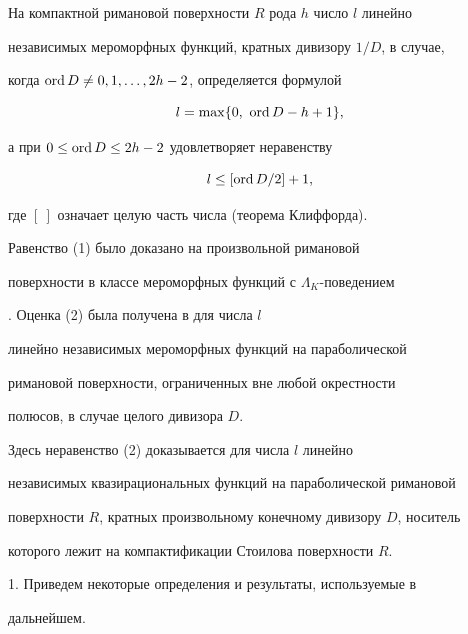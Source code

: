 \label{begin}





На компактной римановой поверхности $R$ рода $h$ число $l$ линейно


независимых мероморфных функций, кратных дивизору $1/D$, в случае,


когда $\operatorname{ord} D\ne 0,1,\dotsc,2h-2$, определяется формулой


\begin{equation}


l=\max\{0,\ \ord D -h+1\},


\end{equation}


а при $0\le\operatorname{ord} D\le 2h-2$ удовлетворяет неравенству


\begin{equation}


l\le [\ord D/2]+1,


\end{equation}


где $[\ ]$ означает целую часть числа (теорема Клиффорда).





Равенство (1) было доказано на произвольной римановой


поверхности в классе мероморфных функций с $\Lambda_K$-поведением


\cite{mz}. Оценка (2) была получена в \cite{m93} для числа $l$


линейно независимых мероморфных функций на параболической


римановой поверхности, ограниченных вне любой окрестности


полюсов, в случае целого дивизора $D$.


Здесь неравенство (2) доказывается для числа $l$ линейно


независимых квазирациональных функций на параболической римановой


поверхности $R$, кратных произвольному конечному дивизору $D$, носитель


которого лежит на компактификации Стоилова поверхности $R$.


\medskip





1. Приведем некоторые определения и результаты, используемые в


дальнейшем.





